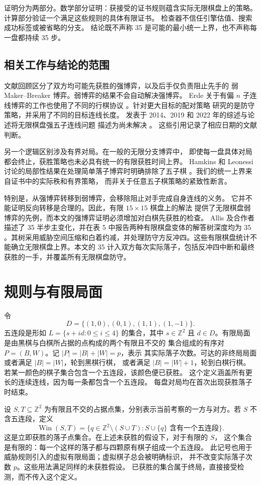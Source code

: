 \documentclass[11pt]{article}
\theoremstyle{definition}
\theoremstyle{remark}
\newcommand{\Z}{\mathbb Z}
\newcommand{\Win}{\operatorname{Win}}
\begin{document}
证明分为两部分。数学部分证明：获接受的证书规则蕴含实际无限棋盘上的策略。
计算部分验证一个满足这些规则的具体有限证书。
检查器不信任引擎估值、搜索成功标签或被省略的分支。
结论既不声称 35 是可能的最小统一上界，也不声称每一盘都持续 35 步。


\subsection{相关工作与结论的范围}
文献回顾区分了双方均可能先获胜的强博弈，以及后手仅负责阻止先手的
弱 Maker--Breaker 博弈。弱博弈的结果不会自动解决强博弈。
Erde 关于有偏 $n$ 子连线博弈的工作也使用了不同的行棋协议
\cite{Erde2012}。针对更大目标的配对策略 \cite{Gyorffy2019}
研究的是防守策略，并采用了不同的目标连线长度。
发表于 2014、2019 和 2022 年的综述与论述将无限棋盘强五子连线问题
描述为尚未解决 \cite{Hefetz2014,Gyorffy2019,Pluhar2022}。
这些引用记录了相应日期的文献判断。

另一个逻辑区别涉及有界对局。在一般的无限分支博弈中，
即使每一盘具体对局都会终止，获胜策略也未必具有统一的有限获胜时间上界。
Hamkins 和 Leonessi 讨论的局部性结果在处理简单落子博弈时明确排除了五子棋
\cite{Hamkins2023}。我们的统一上界来自证书中的实际秩和有界策略，
而非关于任意五子棋策略的紧致性断言。

特别是，从强博弈转移到弱博弈，会移除阻止对手完成自身连线的义务。
它并不能证明反向转移是合理的。因此，有限 $15\times15$ 棋盘上的解法
提供了无限棋盘弱博弈的先例，而本文的强博弈证明必须增加对白棋先获胜的检查。
Allis 及合作者描述了 35 半步主变化，并在表 5 中报告两种有限棋盘变体的解答树深度均为 35 \cite{Allis1993}。其树采用威胁空间压缩和白着约减，并处理防守方反冲四。这些有限棋盘统计不能确立无限棋盘上界。本文的 35 计入双方每次实际落子，包括反冲四中断和最终获胜的一手，并覆盖所有无限棋盘防守。

\section{规则与有限局面}
\label{sec:rules}
令
\[
 D=\{(1,0),(0,1),(1,1),(1,-1)\}.
\]
五连段是形如 $L=\{s+id:0\leq i\leq4\}$ 的集合，其中 $s\in\Z^2$
且 $d\in D$。有限局面是由黑棋与白棋所占据的点构成的两个有限且不交的
集合组成的有序对 $P=(B,W)$。记 $|P|=|B|+|W|=p$，表示
其实际落子次数。可达的非终局局面或者满足 $|B|=|W|$，轮到黑棋行棋，
或者满足 $|B|=|W|+1$，轮到白棋行棋。
若某一颜色的棋子集合包含一个五连段，该颜色便已获胜。
这个定义涵盖所有更长的连续连线，因为每一条都包含一个五连段。
每盘对局均在首次出现获胜落子时结束。

设 $S,T\subseteq\Z^2$ 为有限且不交的占据点集，分别表示当前考察的一方与对方。若 $S$ 不含五连段，定义
\[
 \Win(S,T)=\{q\in\Z^2\setminus(S\cup T):
              S\cup\{q\}\text{ 含有一个五连段}\}.
\]
这是立即获胜的落子点集合。在上述未获胜的假设下，对于有限的 $S$，
这个集合是有限的：每一个这样的落子都与四颗原有棋子组成一个五连段。
此记号也用于威胁规则引入的虚拟有限局面；虚拟棋子总会被明确标识，
并不改变实际落子次数 $p$。这些用法满足同样的未获胜假设。
已获胜的集合属于终局，直接接受检测，而不传入这个定义。
\end{document}
